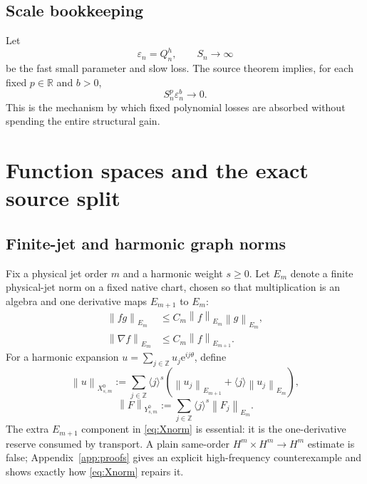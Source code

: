 \documentclass[11pt]{article}
\numberwithin{equation}{section}
\newcommand{\R}{\mathbb R}
\newcommand{\eps}{\varepsilon}
\newcommand{\norm}[1]{\left\lVert #1\right\rVert}
\newcommand{\e}{\mathrm e}
\begin{document}
\subsection{Scale bookkeeping}
Let
\begin{equation}
\eps_n=Q_n^h,
\qquad
S_n\to\infty
\label{eq:epsslow}
\end{equation}
be the fast small parameter and slow loss.  The source theorem  implies, for each fixed \(p\in\R\) and \(b>0\),
\begin{equation}
S_n^p\eps_n^b\longrightarrow0.
\label{eq:slowabsorb}
\end{equation}
This is the mechanism by which fixed polynomial losses are absorbed without spending the entire structural gain.

\section{Function spaces and the exact source split}\label{sec:spaces}

\subsection{Finite-jet and harmonic graph norms}
Fix a physical jet order \(m\) and a harmonic weight \(s\ge0\).  Let \(E_m\) denote a finite physical-jet norm on a fixed native chart, chosen so that multiplication is an algebra and one derivative maps \(E_{m+1}\) to \(E_m\):
\begin{align}
\norm{fg}_{E_m}&\le C_m\norm f_{E_m}\norm g_{E_m},\label{eq:Emalg}\\
\norm{\nabla f}_{E_m}&\le C_m\norm f_{E_{m+1}}.\label{eq:Emder}
\end{align}
For a harmonic expansion \(u=\sum_{j\in\mathbb Z}u_j\e^{ij\theta}\), define
\begin{equation}
\norm u_{X^0_{s,m}}
:=\sum_{j\in\mathbb Z}\langle j\rangle^s
\left(\norm{u_j}_{E_{m+1}}+\langle j\rangle\norm{u_j}_{E_m}\right),
\label{eq:Xnorm}
\end{equation}
\begin{equation}
\norm F_{Y^0_{s,m}}
:=\sum_{j\in\mathbb Z}\langle j\rangle^s\norm{F_j}_{E_m}.
\label{eq:Ynorm}
\end{equation}
The extra \(E_{m+1}\) component in \eqref{eq:Xnorm} is essential: it is the one-derivative reserve consumed by transport.  A plain same-order \(H^m\times H^m\to H^m\) estimate is false; Appendix~\ref{app:proofs} gives an explicit high-frequency counterexample and shows exactly how \eqref{eq:Xnorm} repairs it.
\end{document}
